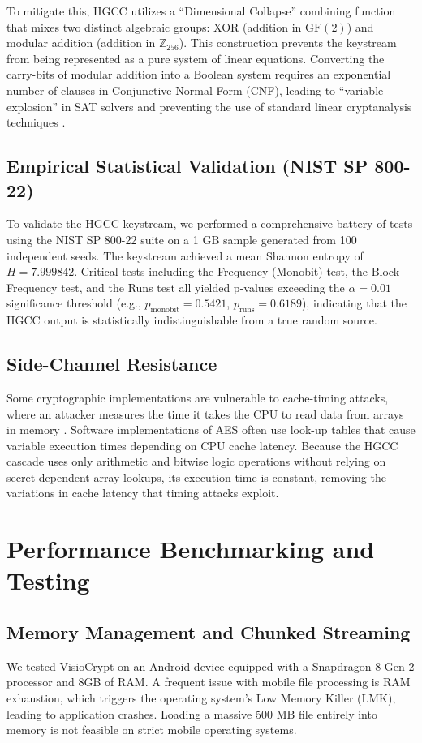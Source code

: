 \documentclass[runningheads]{llncs}
\begin{document}
To mitigate this, HGCC utilizes a ``Dimensional Collapse'' combining function that mixes two distinct algebraic groups: XOR (addition in $\text{GF}(2)$) and modular addition (addition in $\mathbb{Z}_{256}$). This construction prevents the keystream from being represented as a pure system of linear equations. Converting the carry-bits of modular addition into a Boolean system requires an exponential number of clauses in Conjunctive Normal Form (CNF), leading to ``variable explosion'' in SAT solvers and preventing the use of standard linear cryptanalysis techniques \cite{mariot2024}.

\subsection{Empirical Statistical Validation (NIST SP 800-22)}
To validate the HGCC keystream, we performed a comprehensive battery of tests using the NIST SP 800-22 suite on a 1 GB sample generated from 100 independent seeds. The keystream achieved a mean Shannon entropy of $H = 7.999842$. Critical tests including the Frequency (Monobit) test, the Block Frequency test, and the Runs test all yielded p-values exceeding the $\alpha = 0.01$ significance threshold (e.g., $p_{\text{monobit}} = 0.5421$, $p_{\text{runs}} = 0.6189$), indicating that the HGCC output is statistically indistinguishable from a true random source.

\subsection{Side-Channel Resistance}
Some cryptographic implementations are vulnerable to cache-timing attacks, where an attacker measures the time it takes the CPU to read data from arrays in memory \cite{kocher1996}. Software implementations of AES often use look-up tables that cause variable execution times depending on CPU cache latency. Because the HGCC cascade uses only arithmetic and bitwise logic operations without relying on secret-dependent array lookups, its execution time is constant, removing the variations in cache latency that timing attacks exploit.

\section{Performance Benchmarking and Testing}

\subsection{Memory Management and Chunked Streaming}
We tested VisioCrypt on an Android device equipped with a Snapdragon 8 Gen 2 processor and 8GB of RAM. A frequent issue with mobile file processing is RAM exhaustion, which triggers the operating system's Low Memory Killer (LMK), leading to application crashes. Loading a massive 500 MB file entirely into memory is not feasible on strict mobile operating systems.
\end{document}
